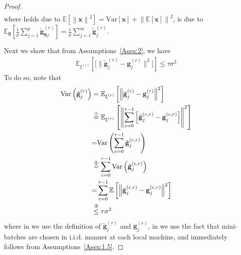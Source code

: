 \documentclass[twoside]{article}
\begin{document}
\begin{proof}
\begin{align}
\end{align}
where  holds due to $\mathbb{E}\left[\left\|\mathbf{x}\right\|^2\right]=\text{Var}[\mathbf{x}]+\left\|\mathbb{E}[\mathbf{x}]\right\|^2$,  is due to $\mathbb{E}_{\mathbf{S}}\left[\frac{1}{p}\sum_{j=1}^p\tilde{\mathbf{g}}_{\mathbf{S}j}^{(r)}\right]=\frac{1}{p}\sum_{j=1}^m\tilde{\mathbf{g}}_{j}^{(r)}$.


Next we show that from Assumptions~\ref{Assu:2}, we have 
\begin{align}\label{eq:100000}
    \mathbb{E}_{\xi^{(r)}}\left[\Big[\|{\tilde{\mathbf{g}}_j^{(r)}}-{\mathbf{g}_j^{(r)}}\|^2\Big]\right]\leq \tau \sigma^2
\end{align}
To do so, note that 
\begin{align}
    \text{Var}\left(\tilde{\mathbf{g}}_{j}^{(r)}\right)&=\mathbb{E}_{\xi^{(r)}}\left[\left\|{\tilde{\mathbf{g}}_j^{(r)}}-{\mathbf{g}_j^{(r)}}\right\|^2\right]\nonumber\\
    &\stackrel{\text{\ding{192}}}{=}\mathbb{E}_{\xi^{(r)}}\left[\left\|\sum_{c=0}^{\tau-1}\left[\tilde{\mathbf{g}}_j^{(c,r)}-\mathbf{g}_j^{(c,r)}\right]\right\|^2\right]\nonumber\\
    &{=}\text{Var}\left(\sum_{c=0}^{\tau-1}\tilde{\mathbf{g}}_j^{(c,r)}\right)\nonumber\\
    &\stackrel{\text{\ding{193}}}{=}\sum_{c=0}^{\tau-1}\text{Var}\left(\tilde{\mathbf{g}}_j^{(c,r)}\right)\nonumber\\
    &{=}\sum_{c=0}^{\tau-1}\mathbb{E}\left[\left\|\tilde{\mathbf{g}}_j^{(c,r)}-\mathbf{g}_j^{(c,r)}\right\|^2\right]\nonumber\\
    &\stackrel{\text{\ding{194}}}{\leq}\tau\sigma^2\label{eq:var_b_mid}
    \end{align}
where in  we use the definition of ${\tilde{\mathbf{g}}}_j^{(r)}$ and ${{\mathbf{g}}}_j^{(r)}$, in  we use the fact that mini-batches are chosen in i.i.d. manner at each local machine, and  immediately follows from Assumptions~\ref{Assu:1.5}.


\end{proof}
\end{document}
